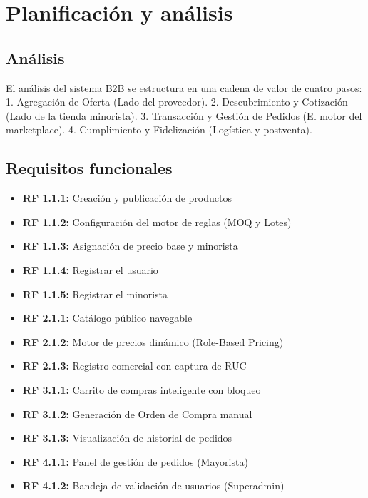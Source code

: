 \documentclass[12pt,a4paper]{report}
\begin{document}
\chapter{Planificación y análisis}

\section{Análisis}
El análisis del sistema B2B se estructura en una cadena de valor de cuatro pasos:
1. Agregación de Oferta (Lado del proveedor).
2. Descubrimiento y Cotización (Lado de la tienda minorista).
3. Transacción y Gestión de Pedidos (El motor del marketplace).
4. Cumplimiento y Fidelización (Logística y postventa).

\section{Requisitos funcionales}
\begin{itemize}
    \item \textbf{RF 1.1.1:} Creación y publicación de productos
    \item \textbf{RF 1.1.2:} Configuración del motor de reglas (MOQ y Lotes)
    \item \textbf{RF 1.1.3:} Asignación de precio base y minorista
    \item \textbf{RF 1.1.4:} Registrar el usuario
    \item \textbf{RF 1.1.5:} Registrar el minorista
    \item \textbf{RF 2.1.1:} Catálogo público navegable
    \item \textbf{RF 2.1.2:} Motor de precios dinámico (Role-Based Pricing)
    \item \textbf{RF 2.1.3:} Registro comercial con captura de RUC
    \item \textbf{RF 3.1.1:} Carrito de compras inteligente con bloqueo
    \item \textbf{RF 3.1.2:} Generación de Orden de Compra manual
    \item \textbf{RF 3.1.3:} Visualización de historial de pedidos
    \item \textbf{RF 4.1.1:} Panel de gestión de pedidos (Mayorista)
    \item \textbf{RF 4.1.2:} Bandeja de validación de usuarios (Superadmin)
\end{itemize}
\end{document}
